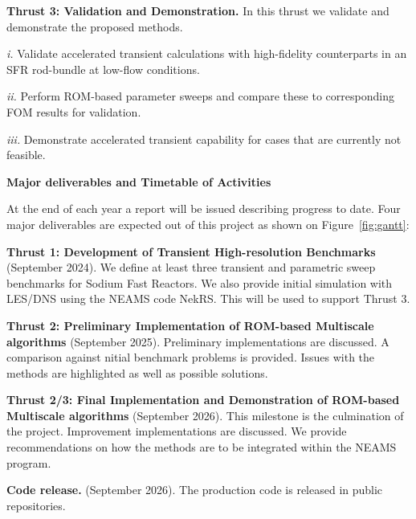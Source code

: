 \textbf{Thrust 3: Validation and Demonstration.} In this thrust we validate and demonstrate the proposed methods.
\\[-4ex]
\begin{description}
\item{\em i.}
Validate accelerated transient calculations with high-fidelity counterparts
in an SFR rod-bundle at low-flow conditions.
\item{\em ii.}
Perform ROM-based parameter sweeps and compare these to corresponding
FOM results for validation.
\item{\em iii.}
Demonstrate accelerated transient capability for cases that are currently not
feasible.  \end{description}

\textbf{Major deliverables and Timetable of Activities}

At the end of each year a report will be issued describing progress to date.
Four major deliverables are expected out of this project as shown on
Figure~\ref{fig:gantt}:

\noindent \textbf{Thrust 1: Development of Transient High-resolution
Benchmarks} (September 2024). We define at least three transient and parametric
sweep benchmarks for Sodium Fast Reactors. We also provide initial simulation
with LES/DNS using the NEAMS code NekRS. This will be used to support Thrust 3.

\noindent \textbf{Thrust 2: Preliminary Implementation of ROM-based Multiscale
algorithms} (September 2025). Preliminary implementations are discussed. A
comparison against nitial  benchmark problems is provided. Issues with the
methods are highlighted as well as possible solutions.

\noindent \textbf{Thrust 2/3: Final Implementation and Demonstration of
ROM-based Multiscale algorithms} (September 2026). This milestone is the
culmination of the project. Improvement implementations are discussed. We
provide recommendations on how the methods are to be integrated within the
NEAMS program.

\noindent \textbf{Code release.} (September 2026). The production code is
released in public repositories.

